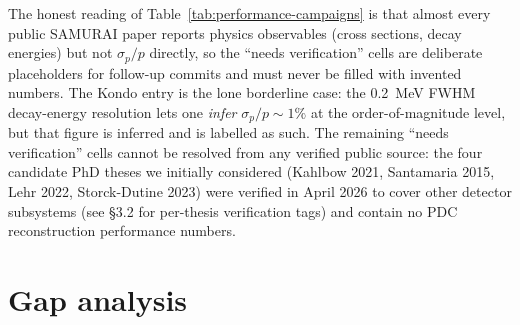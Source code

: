 \documentclass[a4paper, 11pt]{article}
\begin{document}
The honest reading of Table~\ref{tab:performance-campaigns} is that almost every public SAMURAI paper reports physics observables (cross sections, decay energies) but not $\sigma_p/p$ directly, so the ``needs verification'' cells are deliberate placeholders for follow-up commits and must never be filled with invented numbers. The Kondo entry is the lone borderline case: the 0.2~MeV FWHM decay-energy resolution lets one \emph{infer} $\sigma_p/p \sim 1\%$ at the order-of-magnitude level, but that figure is inferred and is labelled as such. The remaining ``needs verification'' cells cannot be resolved from any verified public source: the four candidate PhD theses we initially considered (Kahlbow 2021, Santamaria 2015, Lehr 2022, Storck-Dutine 2023) were verified in April 2026 to cover other detector subsystems (see §3.2 for per-thesis verification tags) and contain no PDC reconstruction performance numbers.

\section{Gap analysis}
\end{document}
